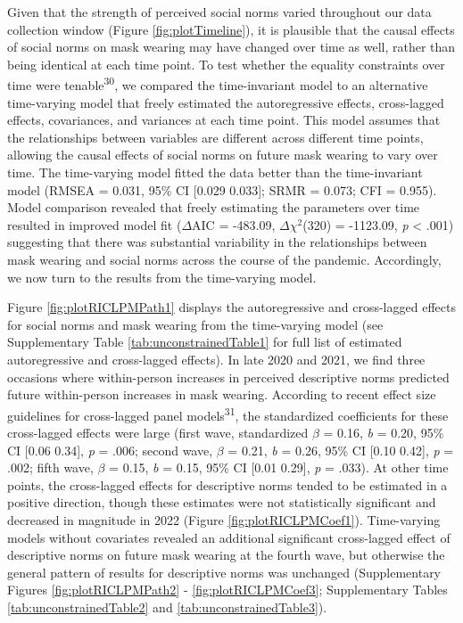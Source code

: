 \documentclass[
  man, donotrepeattitle,floatsintext]{apa6}
\begin{document}
Given that the strength of perceived social norms varied throughout our data collection window (Figure \ref{fig:plotTimeline}), it is plausible that the causal effects of social norms on mask wearing may have changed over time as well, rather than being identical at each time point. To test whether the equality constraints over time were tenable\textsuperscript{30}, we compared the time-invariant model to an alternative time-varying model that freely estimated the autoregressive effects, cross-lagged effects, covariances, and variances at each time point. This model assumes that the relationships between variables are different across different time points, allowing the causal effects of social norms on future mask wearing to vary over time. The time-varying model fitted the data better than the time-invariant model (RMSEA = 0.031, 95\% CI {[}0.029 0.033{]}; SRMR = 0.073; CFI = 0.955). Model comparison revealed that freely estimating the parameters over time resulted in improved model fit (\(\Delta\)AIC = -483.09, \(\Delta\chi^2\)(320) = -1123.09, \emph{p} \textless{} .001) suggesting that there was substantial variability in the relationships between mask wearing and social norms across the course of the pandemic. Accordingly, we now turn to the results from the time-varying model.

Figure \ref{fig:plotRICLPMPath1} displays the autoregressive and cross-lagged effects for social norms and mask wearing from the time-varying model (see Supplementary Table \ref{tab:unconstrainedTable1} for full list of estimated autoregressive and cross-lagged effects). In late 2020 and 2021, we find three occasions where within-person increases in perceived descriptive norms predicted future within-person increases in mask wearing. According to recent effect size guidelines for cross-lagged panel models\textsuperscript{31}, the standardized coefficients for these cross-lagged effects were large (first wave, standardized \(\beta\) = 0.16, \emph{b} = 0.20, 95\% CI {[}0.06 0.34{]}, \emph{p} = .006; second wave, \(\beta\) = 0.21, \emph{b} = 0.26, 95\% CI {[}0.10 0.42{]}, \emph{p} = .002; fifth wave, \(\beta\) = 0.15, \emph{b} = 0.15, 95\% CI {[}0.01 0.29{]}, \emph{p} = .033). At other time points, the cross-lagged effects for descriptive norms tended to be estimated in a positive direction, though these estimates were not statistically significant and decreased in magnitude in 2022 (Figure \ref{fig:plotRICLPMCoef1}). Time-varying models without covariates revealed an additional significant cross-lagged effect of descriptive norms on future mask wearing at the fourth wave, but otherwise the general pattern of results for descriptive norms was unchanged (Supplementary Figures \ref{fig:plotRICLPMPath2} - \ref{fig:plotRICLPMCoef3}; Supplementary Tables \ref{tab:unconstrainedTable2} and \ref{tab:unconstrainedTable3}).
\end{document}
